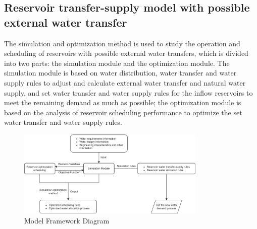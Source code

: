 \subsection{Reservoir transfer-supply model with possible external water transfer}
The simulation and optimization method is used to study the operation and scheduling of reservoirs with possible external water transfers, which is divided into two parts: the simulation module and the optimization module. The simulation module is based on water distribution, water transfer and water supply rules to adjust and calculate external water transfer and natural water supply, and set water transfer and water supply rules for the inflow reservoirs to meet the remaining demand as much as possible; the optimization module is based on the analysis of reservoir scheduling performance to optimize the set water transfer and water supply rules.
\begin{figure}[H]
 \centering
 \label{figure2}
 \includegraphics[width=0.8\textwidth]{figures/allc.png}
 \caption{Model Framework Diagram}
\end{figure}
